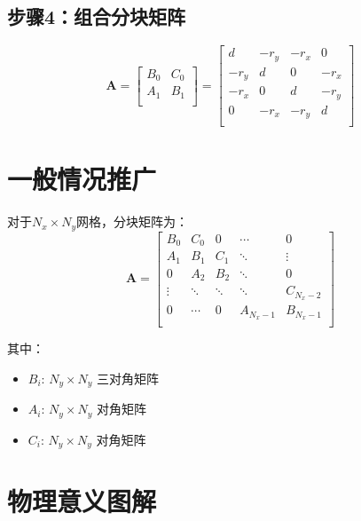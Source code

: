 \documentclass[UTF8]{ctexart}
\begin{document}
\subsection{步骤4：组合分块矩阵}
$$
\mathbf{A} =
\begin{bmatrix}
B_0 & C_0 \\
A_1 & B_1 \\
\end{bmatrix}
=
\begin{bmatrix}
d & -r_y & -r_x & 0 \\
-r_y & d & 0 & -r_x \\
-r_x & 0 & d & -r_y \\
0 & -r_x & -r_y & d \\
\end{bmatrix}
$$

\section{一般情况推广}

对于$N_x \times N_y$网格，分块矩阵为：
$$
\mathbf{A} =
\begin{bmatrix}
B_0 & C_0 & 0 & \cdots & 0 \\
A_1 & B_1 & C_1 & \ddots & \vdots \\
0 & A_2 & B_2 & \ddots & 0 \\
\vdots & \ddots & \ddots & \ddots & C_{N_x-2} \\
0 & \cdots & 0 & A_{N_x-1} & B_{N_x-1} \\
\end{bmatrix}
$$

其中：
\begin{itemize}
\item $B_i$: $N_y \times N_y$ 三对角矩阵
\item $A_i$: $N_y \times N_y$ 对角矩阵
\item $C_i$: $N_y \times N_y$ 对角矩阵
\end{itemize}

\section{物理意义图解}
\end{document}
